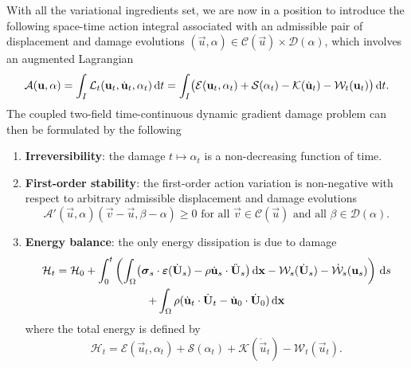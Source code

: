 With all the variational ingredients set, we are now in a position to introduce the following space-time action integral associated with an admissible pair of displacement and damage evolutions $(\vec{u},\alpha)\in\mathcal{C}(\vec{u})\times\mathcal{D}(\alpha)$, which involves an augmented Lagrangian
\begin{equation} \label{eq:actionG}
\mathcal{A}(\vec{u},\alpha)=\int_I\mathcal{L}_t(\vec{u}_t,\dot{\vec{u}}_t,\alpha_t)\,\mathrm{d}t=\int_I\bigl(\mathcal{E}(\vec{u}_t,\alpha_t)+\mathcal{S}(\alpha_t)-\mathcal{K}(\dot{\vec{u}}_t)-\mathcal{W}_t(\vec{u}_t)\bigr)\D{t}.
\end{equation}
The coupled two-field time-continuous dynamic gradient damage problem can then be formulated by the following
\begin{definition} \label{def:dynagraddama} \noindent
\begin{enumerate}
\item \textbf{Irreversibility}: the damage $t\mapsto\alpha_t$ is a non-decreasing function of time.
\item \textbf{First-order stability}: the first-order action variation is non-negative with respect to arbitrary admissible displacement and damage evolutions
\begin{equation} \label{eq:vi}
\mathcal{A}'(\vec{u},\alpha)(\vec{v}-\vec{u},\beta-\alpha)\geq 0\text{ for all $\vec{v}\in\mathcal{C}(\vec{u})$ and all $\beta\in\mathcal{D}(\alpha)$}.
\end{equation}
\item \textbf{Energy balance}: the only energy dissipation is due to damage
\begin{multline} \label{eq:dyngdeb}
\mathcal{H}_t=\mathcal{H}_0+\int_0^t\left(\int_\Omega\bigl(\sig_s\cdot\eps(\dot{\vec{U}}_s)-\rho\dot{\vec{u}}_s\cdot\ddot{\vec{U}}_s\bigr)\dx-\mathcal{W}_s(\dot{\vec{U}}_s)-\dot{\mathcal{W}}_s(\vec{u}_s)\right)\D{s} \\
+\int_\Omega\rho(\dot{\vec{u}}_t\cdot\dot{\vec{U}}_t-\dot{\vec{u}}_0\cdot\dot{\vec{U}}_0)\dx
\end{multline}
where the total energy is defined by
\[
\mathcal{H}_t=\mathcal{E}(\vec{u}_t,\alpha_t)+\mathcal{S}(\alpha_t)+\mathcal{K}(\dot{\vec{u}}_t)-\mathcal{W}_t(\vec{u}_t).
\]
\end{enumerate}
\end{definition}

